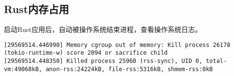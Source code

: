 \documentclass[../../../dolphin-book-2023.tex]{subfiles}
\begin{document}
\subsection{Rust内存占用}

启动Rust应用后，自动被操作系统结束进程，查看操作系统日志。

\begin{lstlisting}
[29569514.446990] Memory cgroup out of memory: Kill process 26178 (tokio-runtime-w) score 2094 or sacrifice child
[29569514.448350] Killed process 25960 (rss-sync), UID 0, total-vm:49068kB, anon-rss:24224kB, file-rss:5316kB, shmem-rss:0kB   
\end{lstlisting}
\end{document}
